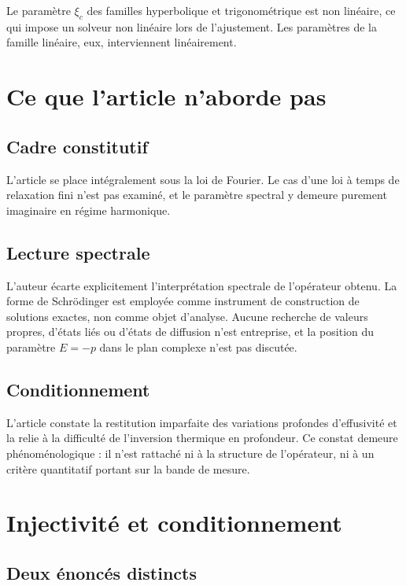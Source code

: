 \documentclass[11pt,a4paper]{article}
\begin{document}
Le paramètre $\xi_{c}$ des familles hyperbolique et trigonométrique est non linéaire, ce qui impose un
solveur non linéaire lors de l'ajustement. Les paramètres de la famille linéaire, eux, interviennent
linéairement.

\section{Ce que l'article n'aborde pas}

\subsection{Cadre constitutif}

L'article se place intégralement sous la loi de Fourier. Le cas d'une loi à temps de relaxation fini
n'est pas examiné, et le paramètre spectral y demeure purement imaginaire en régime harmonique.

\subsection{Lecture spectrale}

L'auteur écarte explicitement l'interprétation spectrale de l'opérateur obtenu. La forme de Schrödinger
est employée comme instrument de construction de solutions exactes, non comme objet d'analyse. Aucune
recherche de valeurs propres, d'états liés ou d'états de diffusion n'est entreprise, et la position du
paramètre $E = -p$ dans le plan complexe n'est pas discutée.

\subsection{Conditionnement}

L'article constate la restitution imparfaite des variations profondes d'effusivité et la relie à la
difficulté de l'inversion thermique en profondeur. Ce constat demeure phénoménologique : il n'est
rattaché ni à la structure de l'opérateur, ni à un critère quantitatif portant sur la bande de mesure.

\section{Injectivité et conditionnement}

\subsection{Deux énoncés distincts}
\end{document}
